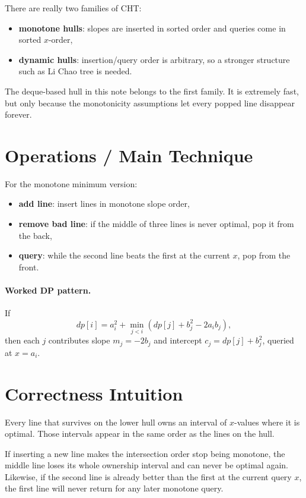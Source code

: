 There are really two families of CHT:

\begin{itemize}
  \item \textbf{monotone hulls}: slopes are inserted in sorted order and queries come in sorted \(x\)-order,
  \item \textbf{dynamic hulls}: insertion/query order is arbitrary, so a stronger structure such as Li Chao tree is
  needed.
\end{itemize}

The deque-based hull in this note belongs to the first family. It is extremely fast, but only because the monotonicity
assumptions let every popped line disappear forever.

\section*{Operations / Main Technique}

For the monotone minimum version:

\begin{itemize}
  \item \textbf{add line}: insert lines in monotone slope order,
  \item \textbf{remove bad line}: if the middle of three lines is never optimal, pop it from the back,
  \item \textbf{query}: while the second line beats the first at the current \(x\), pop from the front.
\end{itemize}

\paragraph{Worked DP pattern.}
If
\[
dp[i] = a_i^2 + \min_{j < i}(dp[j] + b_j^2 - 2 a_i b_j),
\]
then each \(j\) contributes slope \(m_j = -2b_j\) and intercept \(c_j = dp[j] + b_j^2\), queried at \(x = a_i\).

\section*{Correctness Intuition}

Every line that survives on the lower hull owns an interval of \(x\)-values where it is optimal. Those intervals
appear in the same order as the lines on the hull.

If inserting a new line makes the intersection order stop being monotone, the middle line loses its whole ownership
interval and can never be optimal again. Likewise, if the second line is already better than the first at the current
query \(x\), the first line will never return for any later monotone query.

